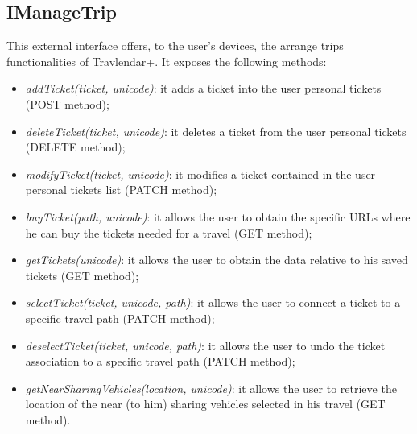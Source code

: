 \subsection{IManageTrip}
\label{subsect:IManageTrip}
This external interface offers, to the user's devices, the arrange trips functionalities of Travlendar+. It exposes the following methods:
\begin{itemize}
	\item \textit{addTicket(ticket, unicode)}: it adds a ticket into the user personal tickets (POST method);
	\item \textit{deleteTicket(ticket, unicode)}: it deletes a ticket from the user personal tickets (DELETE method);
	\item \textit{modifyTicket(ticket, unicode)}: it modifies a ticket contained in the user personal tickets list (PATCH method);
	\item \textit{buyTicket(path, unicode)}: it allows the user to obtain the specific URLs where he can buy the tickets needed for a travel (GET method);
	\item \textit{getTickets(unicode)}: it allows the user to obtain the data relative to his saved tickets (GET method);
	\item \textit{selectTicket(ticket, unicode, path)}: it allows the user to connect a ticket to a specific travel path (PATCH method);
	\item \textit{deselectTicket(ticket, unicode, path)}: it allows the user to undo the ticket association to a specific travel path (PATCH method);
	\item \textit{getNearSharingVehicles(location, unicode)}: it allows the user to retrieve the location of the near (to him) sharing vehicles selected in his travel (GET method).
\end{itemize}

